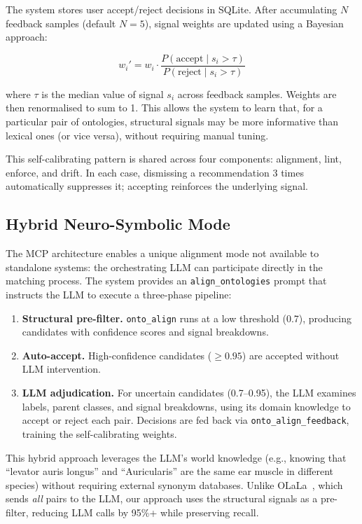 \documentclass[runningheads]{llncs}
\begin{document}
The system stores user accept/reject decisions in SQLite. After accumulating $N$ feedback samples (default $N=5$), signal weights are updated using a Bayesian approach:

\begin{equation}
w_i' = w_i \cdot \frac{P(\text{accept} \mid s_i > \tau)}{P(\text{reject} \mid s_i > \tau)}
\label{eq:feedback}
\end{equation}

where $\tau$ is the median value of signal $s_i$ across feedback samples. Weights are then renormalised to sum to 1. This allows the system to learn that, for a particular pair of ontologies, structural signals may be more informative than lexical ones (or vice versa), without requiring manual tuning.

This self-calibrating pattern is shared across four components: alignment, lint, enforce, and drift. In each case, dismissing a recommendation 3 times automatically suppresses it; accepting reinforces the underlying signal.

\subsection{Hybrid Neuro-Symbolic Mode}

The MCP architecture enables a unique alignment mode not available to standalone systems: the orchestrating LLM can participate directly in the matching process. The system provides an \texttt{align\_ontologies} prompt that instructs the LLM to execute a three-phase pipeline:

\begin{enumerate}
    \item \textbf{Structural pre-filter.} \texttt{onto\_align} runs at a low threshold (0.7), producing candidates with confidence scores and signal breakdowns.
    \item \textbf{Auto-accept.} High-confidence candidates ($\geq 0.95$) are accepted without LLM intervention.
    \item \textbf{LLM adjudication.} For uncertain candidates (0.7--0.95), the LLM examines labels, parent classes, and signal breakdowns, using its domain knowledge to accept or reject each pair. Decisions are fed back via \texttt{onto\_align\_feedback}, training the self-calibrating weights.
\end{enumerate}

This hybrid approach leverages the LLM's world knowledge (e.g., knowing that ``levator auris longus'' and ``Auricularis'' are the same ear muscle in different species) without requiring external synonym databases. Unlike OLaLa~\cite{olala}, which sends \emph{all} pairs to the LLM, our approach uses the structural signals as a pre-filter, reducing LLM calls by 95\%+ while preserving recall.
\end{document}
